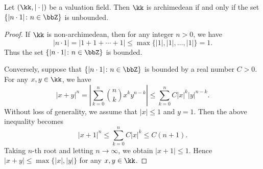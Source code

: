     \begin{proposition}\label{prop:archimedean_iff_integer_are_unbound}
        Let \((\kk,|\cdot|)\) be a valuation field.
        Then \(\kk\) is archimedean if and only if the set \(\{|n \cdot 1|\colon n \in \bbZ\}\) is unbounded.
    \end{proposition}
    \begin{proof}
        If \(\kk\) is non-archimedean, then for any integer \(n > 0\), we have
        \[ |n \cdot 1| = |1 + 1 + \cdots + 1| \leq \max\{|1|, |1|, \ldots, |1|\} = 1. \]
        Thus the set \(\{|n \cdot 1|\colon n \in \bbZ\}\) is bounded.

        Conversely, suppose that \(\{|n \cdot 1|\colon n \in \bbZ\}\) is bounded by a real number \(C > 0\).
        For any \(x,y \in \kk\), we have 
        \[ |x + y|^n = \left| \sum_{k=0}^n \binom{n}{k} x^k y^{n-k} \right| \leq \sum_{k=0}^n C |x|^k |y|^{n-k}. \]
        Without loss of generality, we assume that \(|x| \leq 1\) and \(y = 1\).
        Then the above inequality becomes
        \[ |x + 1|^n \leq \sum_{k=0}^n C |x|^k \leq C (n+1). \]
        Taking \(n\)-th root and letting \(n \to \infty\), we obtain \(|x + 1| \leq 1\).
        Hence \(|x + y| \leq \max\{|x|, |y|\}\) for any \(x,y \in \kk\).
    \end{proof}
            
